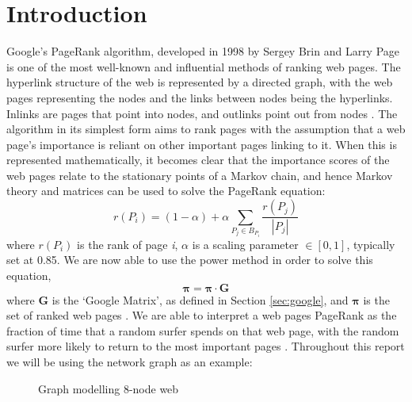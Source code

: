 \documentclass[11pt]{report}
\begin{document}
\chapter{Introduction}\label{chap:import}
Google's PageRank algorithm, developed in 1998 by Sergey Brin and Larry Page is one of the most well-known and influential methods of ranking web pages. The hyperlink structure of the web is represented by a directed graph, with the web pages representing the nodes and the links between nodes being the hyperlinks. Inlinks are pages that point into nodes, and outlinks point out from nodes \cite{brin1998anatomy}. The algorithm in its simplest form aims to rank pages with the assumption that a web page's importance is reliant on other important pages linking to it. When this is represented mathematically, it becomes clear that the importance scores of the web pages relate to the stationary points of a Markov chain, and hence Markov theory and matrices can be used to solve the PageRank equation:
\begin{equation} \label{eq:PR}
r(P_i) = (1-\alpha) + \alpha \displaystyle \sum_{P_j\in B_{P_i }} \frac{r(P_j)}{|P_j|}
\end{equation} where $r(P_i)$ is the rank of page \textit{i}, $\alpha$ is a scaling parameter $\in [0,1]$, typically set at 0.85. We are now able to use the power method in order to solve this equation, 
\[\boldsymbol{\pi} = \boldsymbol{\pi} \cdot \textbf{G}\] 
where \textbf{G} is the `Google Matrix', as defined in Section \ref{sec:google}, and $\boldsymbol{\pi}$ is the set of ranked web pages \cite{langville}.
We are able to interpret a web pages PageRank as the fraction of time that a random surfer spends on that web page, with the random surfer more likely to return to the most important pages \cite{bonato}. Throughout this report we will be using the network graph as an example: 
\begin{figure}[H]
\centering
{}
\caption{Graph modelling 8-node web} \label{fig:Example}
\end{figure}
\end{document}
